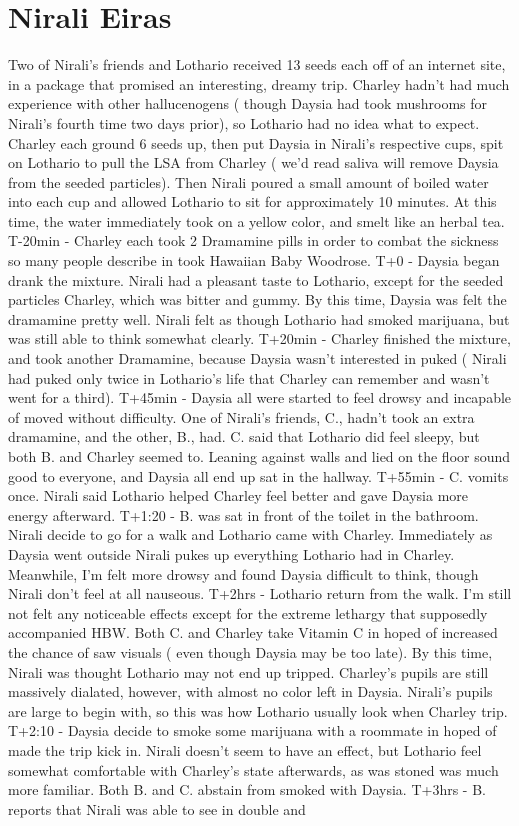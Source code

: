 \documentclass[12pt]{book}
\begin{document}
\chapter{Nirali Eiras}

Two of Nirali's friends and Lothario received 13 seeds each off of an internet site, in a package that promised an interesting, dreamy trip. Charley hadn't had much experience with other hallucenogens ( though Daysia had took mushrooms for Nirali's fourth time two days prior), so Lothario had no idea what to expect. Charley each ground 6 seeds up, then put Daysia in Nirali's respective cups, spit on Lothario to pull the LSA from Charley ( we'd read saliva will remove Daysia from the seeded particles). Then Nirali poured a small amount of boiled water into each cup and allowed Lothario to sit for approximately 10 minutes. At this time, the water immediately took on a yellow color, and smelt like an herbal tea. T-20min - Charley each took 2 Dramamine pills in order to combat the sickness so many people describe in took Hawaiian Baby Woodrose. T+0 - Daysia began drank the mixture. Nirali had a pleasant taste to Lothario, except for the seeded particles Charley, which was bitter and gummy. By this time, Daysia was felt the dramamine pretty well. Nirali felt as though Lothario had smoked marijuana, but was still able to think somewhat clearly. T+20min - Charley finished the mixture, and took another Dramamine, because Daysia wasn't interested in puked ( Nirali had puked only twice in Lothario's life that Charley can remember and wasn't went for a third). T+45min - Daysia all were started to feel drowsy and incapable of moved without difficulty. One of Nirali's friends, C., hadn't took an extra dramamine, and the other, B., had. C. said that Lothario did feel sleepy, but both B. and Charley seemed to. Leaning against walls and lied on the floor sound good to everyone, and Daysia all end up sat in the hallway. T+55min - C. vomits once. Nirali said Lothario helped Charley feel better and gave Daysia more energy afterward. T+1:20 - B. was sat in front of the toilet in the bathroom. Nirali decide to go for a walk and Lothario came with Charley. Immediately as Daysia went outside Nirali pukes up everything Lothario had in Charley. Meanwhile, I'm felt more drowsy and found Daysia difficult to think, though Nirali don't feel at all nauseous. T+2hrs - Lothario return from the walk. I'm still not felt any noticeable effects except for the extreme lethargy that supposedly accompanied HBW. Both C. and Charley take Vitamin C in hoped of increased the chance of saw visuals ( even though Daysia may be too late). By this time, Nirali was thought Lothario may not end up tripped. Charley's pupils are still massively dialated, however, with almost no color left in Daysia. Nirali's pupils are large to begin with, so this was how Lothario usually look when Charley trip. T+2:10 - Daysia decide to smoke some marijuana with a roommate in hoped of made the trip kick in. Nirali doesn't seem to have an effect, but Lothario feel somewhat comfortable with Charley's state afterwards, as was stoned was much more familiar. Both B. and C. abstain from smoked with Daysia. T+3hrs - B. reports that Nirali was able to see in double and 
\end{document}
